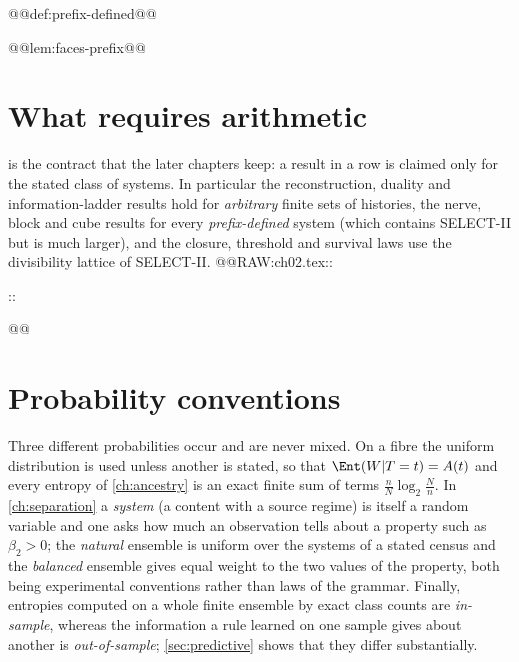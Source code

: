 @@def:prefix-defined@@

@@lem:faces-prefix@@

\section{What requires arithmetic}\label{sec:needs}
 is the contract that the later chapters keep: a result in a row is claimed only for the stated class of systems. In particular the reconstruction, duality and information-ladder results hold for \emph{arbitrary} finite sets of histories, the nerve, block and cube results for every \emph{prefix-defined} system (which contains SELECT-II but is much larger), and the closure, threshold and survival laws use the divisibility lattice of SELECT-II.
@@RAW:ch02.tex::\begin{table}[ht]\centering\small::\end{table}@@

\section{Probability conventions}\label{sec:probconv}
Three different probabilities occur and are never mixed. On a fibre the uniform distribution is used unless another is stated, so that $\Ent(W|T=t)=A(t)$ and every entropy of \cref{ch:ancestry} is an exact finite sum of terms $\frac nN\log_2\frac Nn$. In \cref{ch:separation} a \emph{system} (a content with a source regime) is itself a random variable and one asks how much an observation tells about a property such as $\beta_2>0$; the \emph{natural} ensemble is uniform over the systems of a stated census and the \emph{balanced} ensemble gives equal weight to the two values of the property, both being experimental conventions rather than laws of the grammar. Finally, entropies computed on a whole finite ensemble by exact class counts are \emph{in-sample}, whereas the information a rule learned on one sample gives about another is \emph{out-of-sample}; \cref{sec:predictive} shows that they differ substantially.
